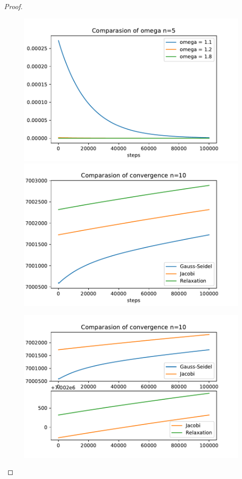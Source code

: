 \documentclass[11pt,a4paper]{article}
\renewcommand{\(}{\left(}
\renewcommand{\)}{\right)}
\begin{document}
\begin{proof}
    \begin{figure}
    	\includegraphics[]{omega-n5}
  		\includegraphics[]{n10-all}
  	\end{figure}
  	\begin{figure}
  		\includegraphics[]{n10}

\end{figure}
\end{proof}
\end{document}
